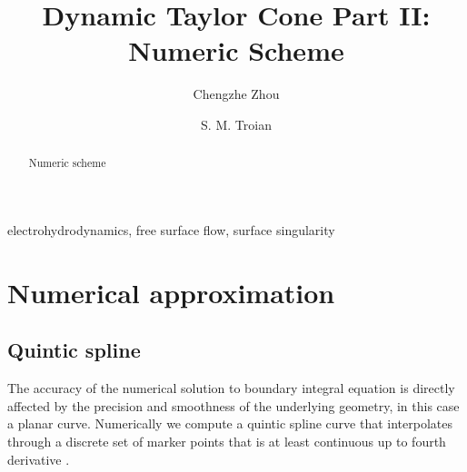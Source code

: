 \documentclass{jfm}
\title{Dynamic Taylor Cone Part II: Numeric Scheme}
\author{ Chengzhe Zhou\aff{1}
 \and S. M. Troian\aff{2}   \corresp{\email{stroian@caltech.edu}}}
\affiliation{\aff{1}Division of Physics, Mathematics and Astronomy, California Institute of Technology,
Pasadena, CA 91125, USA
\aff{2}Department of Applied Physics and Materials Science, 
California Institute of Technology,
Pasadena, CA 91125, USA}
\begin{document}
\maketitle
\tableofcontents
\begin{abstract}
Numeric scheme %
\end{abstract}

\begin{keywords}
electrohydrodynamics, free surface flow, surface singularity 
\end{keywords}
\section{Numerical approximation}
\subsection{Quintic spline}
The accuracy of the numerical solution to boundary integral equation is directly affected by
the precision and smoothness of the underlying geometry, in this case a planar curve.
Numerically we compute a quintic spline curve that interpolates through a discrete set of marker points
that is at least continuous up to fourth derivative \citep{Mund75}.
\end{document}

